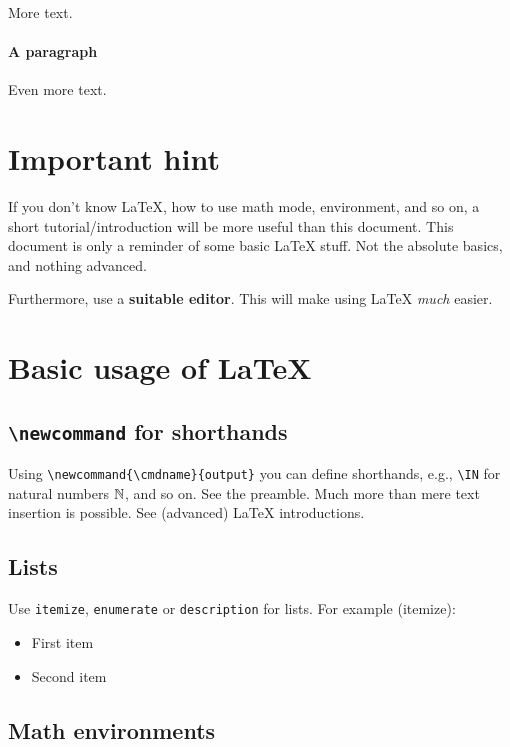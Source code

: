 \documentclass[11pt]{scrartcl}
\begin{document}
More text.

\paragraph*{A paragraph}

Even more text.


\section{Important hint}

If you don't know \LaTeX{}, how to use math mode, environment, and so on,
a short tutorial/introduction will be more useful than this document.
This document is only a reminder of some basic \LaTeX{} stuff.
Not the absolute basics, and nothing advanced.

Furthermore, use a \textbf{suitable editor}.
This will make using \LaTeX{} \emph{much} easier.

\section{Basic usage of \LaTeX}
\label{sec:math-and-env}


\subsection{{\texttt{\textbackslash{}newcommand} for shorthands}}
\label{subsec:newcommand}

Using \verb|\newcommand{\cmdname}{output}| you can define shorthands,
e.g., \verb|\IN| for natural numbers $\mathbb{N}$, and so on.
See the preamble.
Much more than mere text insertion is possible.
See (advanced) \LaTeX{} introductions.

\subsection{Lists}
\label{subsec:lists}

Use \verb|itemize|, \verb|enumerate| or \verb|description| for lists.
For example (itemize):
\begin{itemize}
	\item First item
	\item Second item
\end{itemize}


\subsection{Math environments}
\label{subsec:math-env}
\end{document}
